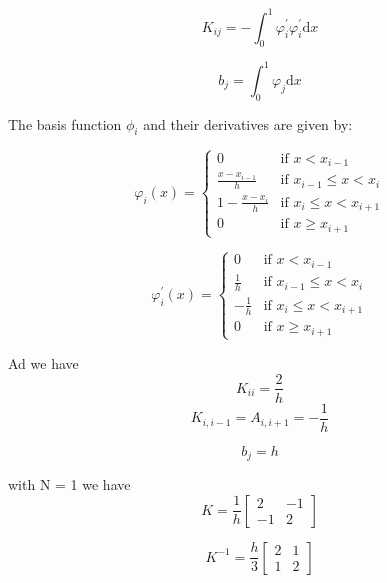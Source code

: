 \documentclass[10pt,a4paper]{report}
\begin{document}
\begin{equation}
K_{ij} = -\int_{0}^{1} \varphi_{i}^{\prime}\varphi_{i}^{\prime} \mathrm{d}x \nonumber
\end{equation}

\begin{equation}
b_{j} = \int_{0}^{1}\varphi_{j} \mathrm{d}x \nonumber
\end{equation}

The basis function $\phi_{i}$ and their derivatives are given by:

\[
 \varphi_{i}(x) =
  \begin{cases}
   0 & \text{if } x < x_{i-1} \\
   \frac{x-x_{i-1}}{h}       & \text{if } x_{i-1} \leq  x < x_{i}\\
   1-\frac{x-x_{i}}{h}      & \text{if } x_{i} \leq  x < x_{i+1}\\
   0     & \text{if }   x \ge x_{i+1}
  \end{cases}
\]

\[
 \varphi_{i}^{\prime}(x) =
  \begin{cases}
   0 & \text{if } x < x_{i-1} \\
   \frac{1}{h}       & \text{if } x_{i-1} \leq  x < x_{i}\\
   -\frac{1}{h}      & \text{if } x_{i} \leq  x < x_{i+1}\\
   0     & \text{if }   x \ge x_{i+1}
  \end{cases}
\]

Ad we have
\begin{equation}
K_{ii} = \frac{2}{h} \nonumber
\end{equation}
\begin{equation}
K_{i,i-1} = A_{i,i+1} =-\frac{1}{h}\nonumber
\end{equation}

\begin{equation}
b_{j} =  h \nonumber
\end{equation}

with N = 1 we have
\begin{equation}
K =\frac{1}{h} \begin{bmatrix}
       2 & -1           \\
       -1& 2             
     \end{bmatrix}
\end{equation}

\begin{equation}
K^{-1} =\frac{h}{3} \begin{bmatrix}
       2 & 1           \\
       1& 2             
     \end{bmatrix}
\end{equation}
\end{document}
